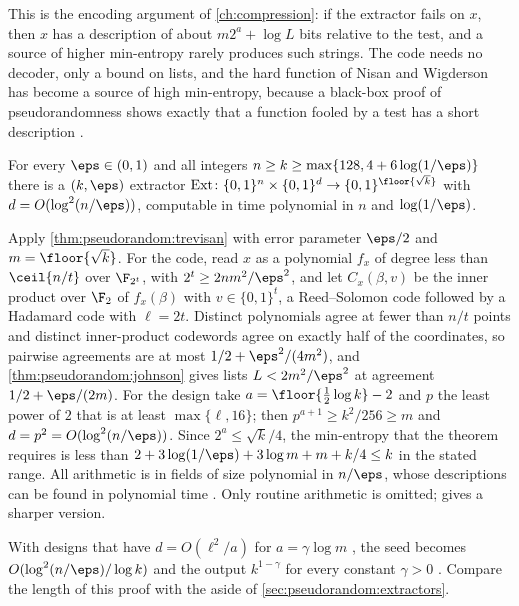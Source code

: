 \begin{refsection}
This is the encoding argument of \cref{ch:compression}: if the extractor fails on $x$, then $x$ has a description of about $m2^a+\log L$ bits relative to the test, and a source of higher min-entropy rarely produces such strings. The code needs no decoder, only a bound on lists, and the hard function of Nisan and Wigderson has become a source of high min-entropy, because a black-box proof of pseudorandomness shows exactly that a function fooled by a test has a short description \parencite[\S7.7]{Vadhan2012}.

\begin{corollary}\label{cor:pseudorandom:explicit}
For every $\eps\in(0,1)$ and all integers $n\ge k\ge\max\{128,4+6\log(1/\eps)\}$ there is a $(k,\eps)$ extractor $\pseudorandomExt\colon\{0,1\}^n\times\{0,1\}^d\to\{0,1\}^{\floor{\sqrt k}}$ with $d=O(\log^2(n/\eps))$, computable in time polynomial in $n$ and $\log(1/\eps)$.
\end{corollary}

\begin{proofsketch}
Apply \cref{thm:pseudorandom:trevisan} with error parameter $\eps/2$ and $m=\floor{\sqrt k}$. For the code, read $x$ as a polynomial $f_x$ of degree less than $\ceil{n/t}$ over $\F_{2^t}$, with $2^t\ge2nm^2/\eps^2$, and let $C_x(\beta,v)$ be the inner product over $\F_2$ of $f_x(\beta)$ with $v\in\{0,1\}^t$, a Reed--Solomon code followed by a Hadamard code with $\ell=2t$. Distinct polynomials agree at fewer than $n/t$ points and distinct inner-product codewords agree on exactly half of the coordinates, so pairwise agreements are at most $1/2+\eps^2/(4m^2)$, and \cref{thm:pseudorandom:johnson} gives lists $L<2m^2/\eps^2$ at agreement $1/2+\eps/(2m)$. For the design take $a=\floor{\frac12\log k}-2$ and $p$ the least power of $2$ that is at least $\max\{\ell,16\}$; then $p^{a+1}\ge k^2/256\ge m$ and $d=p^2=O(\log^2(n/\eps))$. Since $2^a\le\sqrt k/4$, the min-entropy that the theorem requires is less than $2+3\log(1/\eps)+3\log m+m+k/4\le k$ in the stated range. All arithmetic is in fields of size polynomial in $n/\eps$, whose descriptions can be found in polynomial time \parencite[\S5.4]{Vadhan2012}. Only routine arithmetic is omitted; \textcite[Theorem~7.73]{Vadhan2012} gives a sharper version.
\end{proofsketch}

With designs that have $d=O(\ell^2/a)$ for $a=\gamma\log m$ \parencite[Lemma~7.22]{Vadhan2012}, the seed becomes $O(\log^2(n/\eps)/\log k)$ and the output $k^{1-\gamma}$ for every constant $\gamma>0$ \parencite[Theorem~7.73]{Vadhan2012}. Compare the length of this proof with the aside of \cref{sec:pseudorandom:extractors}.


\end{refsection}
